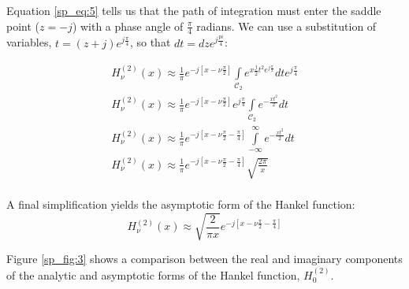 Equation \ref{sp_eq:5} tells us that the path of integration must enter the saddle point ($z=-j$) with a phase angle of $\frac{\pi}{4}$ radians. We can use a substitution of variables, $t=(z+j)e^{j\frac{\pi}{4}}$, so that $dt = dze^{j\frac{pi}{4}}$:

\begin{equation}
  \begin{gathered}
    H_{\nu}^{(2)}(x) \approx \frac{1}{\pi}e^{-j\left[x - \nu\frac{\pi}{2}\right]}\int\limits_{\mathcal{C}_2}e^{x\frac{j}{2}t^2e^{j\frac{\pi}{2}}} dte^{j\frac{\pi}{4}} \\
    H_{\nu}^{(2)}(x) \approx \frac{1}{\pi}e^{-j\left[x - \nu\frac{\pi}{2}\right]}e^{j\frac{\pi}{4}}\int\limits_{\mathcal{C}_2}e^{-\frac{xt^2}{2}} dt \\
     H_{\nu}^{(2)}(x) \approx  \frac{1}{\pi}e^{-j\left[x - \nu\frac{\pi}{2} - \frac{\pi}{4}\right]}\int\limits_{-\infty}^{\infty}e^{-\frac{xt^2}{2}} dt \\
    H_{\nu}^{(2)}(x) \approx \frac{1}{\pi}e^{-j\left[x - \nu\frac{\pi}{2} - \frac{\pi}{4}\right]}\sqrt{\frac{2\pi}{x}}\\
    \end{gathered}
  \label{sp_eq:6}
  \end{equation}
\renewcommand{\baselinestretch}{2} \small\normalsize

\noindent A final simplification yields the asymptotic form of the Hankel function:
\begin{equation}
    \boxed{H_{\nu}^{(2)}(x) \approx \sqrt{\frac{2}{\pi x}}e^{-j\left[x - \nu\frac{\pi}{2} - \frac{\pi}{4}\right]}}
  \label{sp_eq:7}
  \end{equation}
\renewcommand{\baselinestretch}{2} \small\normalsize

Figure \ref{sp_fig:3} shows a comparison between the real and imaginary components of the analytic and asymptotic forms of the Hankel function, $H_0^{(2)}$.

